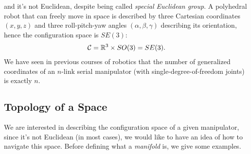 \documentclass[10pt, a4paper]{report}
\begin{document}
and it's not Euclidean, despite being called \textit{special Euclidean group}. A polyhedral robot that can freely move in space is described by three Cartesian coordinates $(x,y,z)$ and three roll-pitch-yaw angles $(\alpha,\beta,\gamma)$ describing its orientation, hence the configuration space is $SE(3)$:
\begin{equation}
    \mathcal C = {\mathbb R}^3\times SO(3)=SE(3).
\end{equation}
We have seen in previous courses of robotics that the number of generalized coordinates of an $n$-link serial manipulator (with single-degree-of-freedom joints) is exactly $n$.
\subsection{Topology of a Space}
We are interested in describing the configuration space of a given manipulator, since it's not Euclidean (in most cases), we would like to have an idea of how to navigate this space. Before defining what a \textit{manifold} is, we give some examples.\bigskip 
\end{document}
